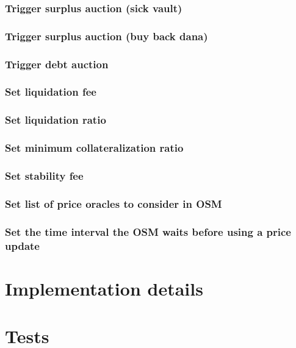 \documentclass{article} %
\begin{document}
\subsubsection{Trigger surplus auction (sick vault)}

\subsubsection{Trigger surplus auction (buy back dana)}

\subsubsection{Trigger debt auction}

\subsubsection{Set liquidation fee}

\subsubsection{Set liquidation ratio}

\subsubsection{Set minimum collateralization ratio}

\subsubsection{Set stability fee}

\subsubsection{Set list of price oracles to consider in OSM}

\subsubsection{Set the time interval the OSM waits before using a price update}


\section{Implementation details}

\section{Tests}

% 
\end{document}
